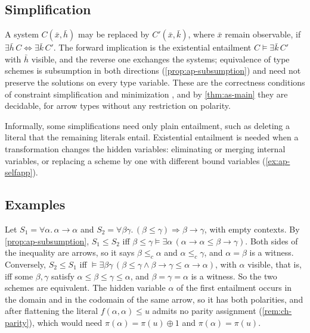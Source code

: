 \subsection{Simplification}\label{sec:ap-simplification}

A system $C(\bar x,\bar h)$ may be replaced by $C'(\bar x,\bar k)$, where
$\bar x$ remain observable, if $\exists\bar h\,C\iff\exists\bar k\,C'$. The
forward implication is the existential entailment $C\models\exists\bar k\,C'$
with $\bar h$ visible, and the reverse one exchanges the systems; equivalence
of type schemes is subsumption in both directions
(\cref{prop:ap-subsumption}) and need not preserve the solutions on every type
variable. These are the correctness conditions of constraint simplification
and minimization \citep{Pottier96,Pottier01,TrifonovSmith96,EifrigSmithTrifonov95},
and by \cref{thm:as-main} they are decidable, for arrow types without any
restriction on polarity.

Informally, some simplifications need only plain entailment, such as
deleting a literal that the remaining literals entail. Existential entailment
is needed when a transformation changes the hidden variables: eliminating or
merging internal variables, or replacing a scheme by one with different bound
variables (\cref{ex:ap-selfapp}).

\subsection{Examples}\label{sec:ap-examples}

\begin{example}\label{ex:ap-identity}
Let $S_1=\forall\alpha.\,\alpha\to\alpha$ and
$S_2=\forall\beta\gamma.\,(\beta\le\gamma)\Rightarrow\beta\to\gamma$, with empty
contexts. By \cref{prop:ap-subsumption}, $S_1\le S_2$ iff
$\beta\le\gamma\models\exists\alpha\,(\alpha\to\alpha\le\beta\to\gamma)$. Both
sides of the inequality are arrows, so it says $\beta\le_c\alpha$ and
$\alpha\le_c\gamma$, and $\alpha=\beta$ is a witness. Conversely, $S_2\le S_1$
iff $\models\exists\beta\gamma\,(\beta\le\gamma\wedge
\beta\to\gamma\le\alpha\to\alpha)$, with $\alpha$ visible, that is, iff some
$\beta,\gamma$ satisfy $\alpha\le\beta\le\gamma\le\alpha$, and
$\beta=\gamma=\alpha$ is a witness. So the two schemes are equivalent. The
hidden variable $\alpha$ of the first entailment occurs in the domain and in
the codomain of the same arrow, so it has both polarities, and after
flattening the literal $f(\alpha,\alpha)\le u$ admits no parity assignment
(\cref{rem:ch-parity}), which would need $\pi(\alpha)=\pi(u)\oplus1$ and
$\pi(\alpha)=\pi(u)$.
\end{example}

